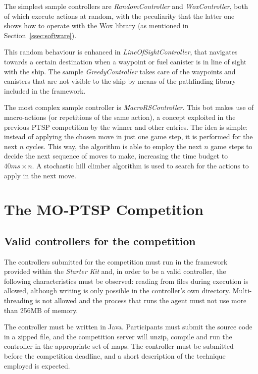 \documentclass[conference]{IEEEtran}
\begin{document}
The simplest sample controllers are \textit{RandomController} and \textit{WoxController}, both of which execute actions at random, with the peculiarity that the latter one shows how to operate with the Wox library (as mentioned in Section~\ref{ssec:software}).

This random behaviour is enhanced in \textit{LineOfSightController}, that navigates towards a certain destination when a waypoint or fuel canister is in line of sight with the ship. The sample \textit{GreedyController} takes care of the waypoints and canisters that are not visible to the ship by means of the pathfinding library included in the framework.

The most complex sample controller is \textit{MacroRSController}. This bot makes use of macro-actions (or repetitions of the same action), a concept exploited in the previous PTSP competition by the winner and other entries. The idea is simple: instead of applying the chosen move in just one game step, it is performed for the next $n$ cycles. This way, the algorithm is able to employ the next $n$ game steps to decide the next sequence of moves to make, increasing the time budget to $40ms \times n$. A stochastic hill climber algorithm is used to search for the actions to apply in the next move.

\section{The MO-PTSP Competition} \label{sec:comp}

\subsection{Valid controllers for the competition}

The controllers submitted for the competition must run in the framework provided within the \textit{Starter Kit} and, in order to be a valid controller, the following characteristics must be observed: reading from files during execution is allowed, although writing is only possible in the controller's own directory. Multi-threading is not allowed and the process that runs the agent must not use more than 256MB of memory.

The controller must be written in Java. Participants must submit the source code in a zipped file, and the competition server will unzip, compile and run the controller in the appropriate set of maps. The controller must be submitted before the competition deadline, and a short description of the technique employed is expected.
\end{document}
